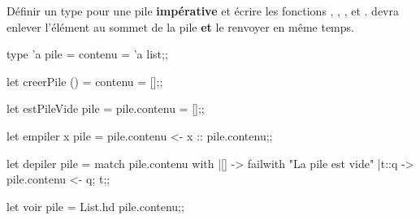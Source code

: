 \begin{question}{}{}
Définir un type  pour une pile {\bf impérative} et écrire les fonctions , , ,  et .  devra enlever l'élément au sommet de la pile {\bf et} le renvoyer en même temps.

\reponse

\begin{ocaml}
type 'a pile = {contenu = 'a list};;

let creerPile () = {contenu = []};;

let estPileVide pile =
   pile.contenu = [];;

let empiler x pile = 
   pile.contenu  <- x :: pile.contenu;;
   
let depiler pile = 
   match pile.contenu with
   |[] -> failwith "La pile est vide"
   |t::q -> pile.contenu <- q;
            t;;
            
let voir pile = List.hd pile.contenu;;
\end{ocaml}


\newpage
\end{question}
